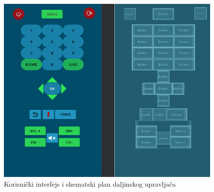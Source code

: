 \documentclass[implementacija.tex]{subfiles}
\begin{document}
\begin{figure}[!ht]
  \centering
  \includegraphics[width=\textwidth]{Implementacija/snimci_ekrana/shema_daljinskog.png}
  \caption{Korisnički interfejs i shematski plan daljinskog upravljača}
  \label{fig:remoteScena}
\end{figure}
\end{document}
